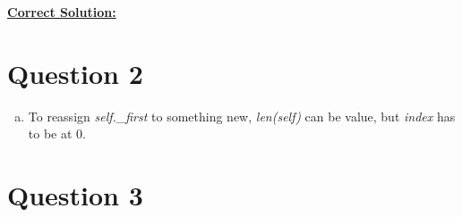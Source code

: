 \documentclass[12pt]{article}
\begin{document}
\begin{enumerate}[a.]
    \newpage

    \begin{mdframed}
        \underline{\textbf{Correct Solution:}}

        \bigskip

    \end{mdframed}

\end{enumerate}

\section*{Question 2}
\begin{enumerate}[a.]
    \item To reassign \textit{self.\_first} to something new, \textit{len(self)}
    can be value, but \textit{index} has to be at 0.
\end{enumerate}


\section*{Question 3}
\end{document}
